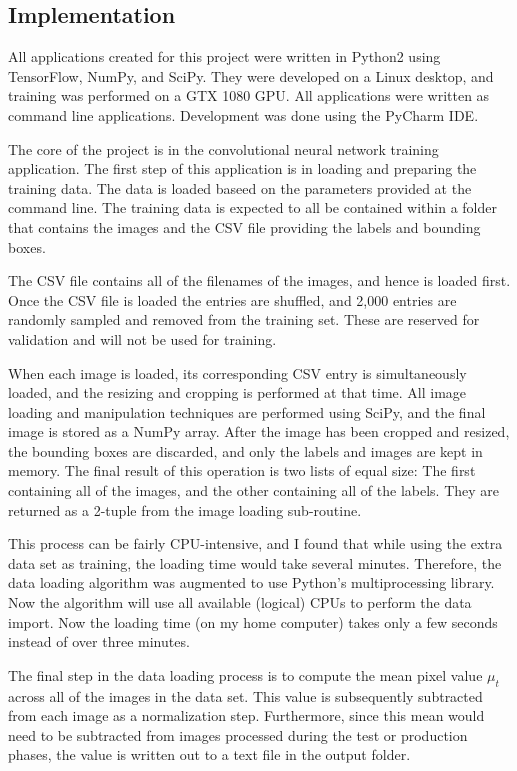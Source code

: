 \documentclass[12pt]{article}
\begin{document}
\subsection{Implementation}
All applications created for this project were written in Python2 using TensorFlow, NumPy, and SciPy. 
They were developed on a Linux desktop, and training was performed on a GTX 1080 GPU.
All applications were written as command line applications.
Development was done using the PyCharm IDE.

The core of the project is in the convolutional neural network training application.
The first step of this application is in loading and preparing the training data.
The data is loaded baseed on the parameters provided at the command line. 
The training data is expected to all be contained within a folder that contains the images and the CSV file providing the labels and bounding boxes.

The CSV file contains all of the filenames of the images, and hence is loaded first.
Once the CSV file is loaded the entries are shuffled, and 2,000 entries are randomly sampled and removed from the training set.
These are reserved for validation and will not be used for training.

When each image is loaded, its corresponding CSV entry is simultaneously loaded, and the resizing and cropping is performed at that time.
All image loading and manipulation techniques are performed using SciPy, and the final image is stored as a NumPy array.
After the image has been cropped and resized, the bounding boxes are discarded, and only the labels and images are kept in memory.
The final result of this operation is two lists of equal size: The first containing all of the images, and the other containing all of the labels. They are returned as a 2-tuple from the image loading sub-routine.

This process can be fairly CPU-intensive, and I found that while using the extra data set as training, the loading time would take several minutes. 
Therefore, the data loading algorithm was augmented to use Python's multiprocessing library.
Now the algorithm will use all available (logical) CPUs to perform the data import.
Now the loading time (on my home computer) takes only a few seconds instead of over three minutes.

The final step in the data loading process is to compute the mean pixel value $\mu_t$ across all of the images in the data set.
This value is subsequently subtracted from each image as a normalization step.
Furthermore, since this mean would need to be subtracted from images processed during the test or production phases, the value is written out to a text file in the output folder.
\end{document}
